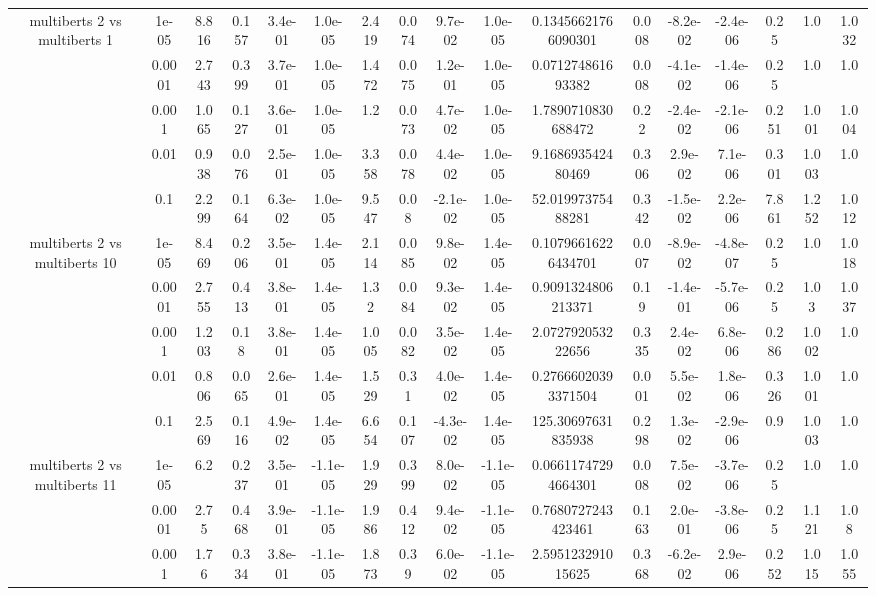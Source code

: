 \begin{tabular}{|c|c|c|c|c|c|c|c|c|c|c|c|c|c|c|c|c|}
\hline
\multirow{5}{*}{multiberts 2 vs multiberts 1} & 1e-05 & 8.816 & 0.157 & 3.4e-01 & 1.0e-05 & 2.419 & 0.074 & 9.7e-02 & 1.0e-05 & 0.13456621766090301 & 0.008 & -8.2e-02 & -2.4e-06 & 0.25 & 1.0 & 1.032 \\
 & 0.0001 & 2.743 & 0.399 & 3.7e-01 & 1.0e-05 & 1.472 & 0.075 & 1.2e-01 & 1.0e-05 & 0.071274861693382 & 0.008 & -4.1e-02 & -1.4e-06 & 0.25 & 1.0 & 1.0 \\
 & 0.001 & 1.065 & 0.127 & 3.6e-01 & 1.0e-05 & 1.2 & 0.073 & 4.7e-02 & 1.0e-05 & 1.7890710830688472 & 0.22 & -2.4e-02 & -2.1e-06 & 0.251 & 1.001 & 1.004 \\
 & 0.01 & 0.938 & 0.076 & 2.5e-01 & 1.0e-05 & 3.358 & 0.078 & 4.4e-02 & 1.0e-05 & 9.168693542480469 & 0.306 & 2.9e-02 & 7.1e-06 & 0.301 & 1.003 & 1.0 \\
 & 0.1 & 2.299 & 0.164 & 6.3e-02 & 1.0e-05 & 9.547 & 0.08 & -2.1e-02 & 1.0e-05 & 52.01997375488281 & 0.342 & -1.5e-02 & 2.2e-06 & 7.861 & 1.252 & 1.012 \\
\hline
\multirow{5}{*}{multiberts 2 vs multiberts 10} & 1e-05 & 8.469 & 0.206 & 3.5e-01 & 1.4e-05 & 2.114 & 0.085 & 9.8e-02 & 1.4e-05 & 0.10796616226434701 & 0.007 & -8.9e-02 & -4.8e-07 & 0.25 & 1.0 & 1.018 \\
 & 0.0001 & 2.755 & 0.413 & 3.8e-01 & 1.4e-05 & 1.32 & 0.084 & 9.3e-02 & 1.4e-05 & 0.9091324806213371 & 0.19 & -1.4e-01 & -5.7e-06 & 0.25 & 1.03 & 1.037 \\
 & 0.001 & 1.203 & 0.18 & 3.8e-01 & 1.4e-05 & 1.005 & 0.082 & 3.5e-02 & 1.4e-05 & 2.072792053222656 & 0.335 & 2.4e-02 & 6.8e-06 & 0.286 & 1.002 & 1.0 \\
 & 0.01 & 0.806 & 0.065 & 2.6e-01 & 1.4e-05 & 1.529 & 0.31 & 4.0e-02 & 1.4e-05 & 0.27666020393371504 & 0.001 & 5.5e-02 & 1.8e-06 & 0.326 & 1.001 & 1.0 \\
 & 0.1 & 2.569 & 0.116 & 4.9e-02 & 1.4e-05 & 6.654 & 0.107 & -4.3e-02 & 1.4e-05 & 125.30697631835938 & 0.298 & 1.3e-02 & -2.9e-06 & 0.9 & 1.003 & 1.0 \\
\hline
\multirow{5}{*}{multiberts 2 vs multiberts 11} & 1e-05 & 6.2 & 0.237 & 3.5e-01 & -1.1e-05 & 1.929 & 0.399 & 8.0e-02 & -1.1e-05 & 0.06611747294664301 & 0.008 & 7.5e-02 & -3.7e-06 & 0.25 & 1.0 & 1.0 \\
 & 0.0001 & 2.75 & 0.468 & 3.9e-01 & -1.1e-05 & 1.986 & 0.412 & 9.4e-02 & -1.1e-05 & 0.7680727243423461 & 0.163 & 2.0e-01 & -3.8e-06 & 0.25 & 1.121 & 1.08 \\
 & 0.001 & 1.76 & 0.334 & 3.8e-01 & -1.1e-05 & 1.873 & 0.39 & 6.0e-02 & -1.1e-05 & 2.595123291015625 & 0.368 & -6.2e-02 & 2.9e-06 & 0.252 & 1.015 & 1.055 \\

\end{tabular}
